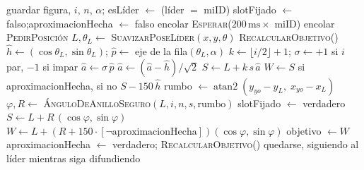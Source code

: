\documentclass[11pt,a4paper]{article}
\theoremstyle{plain}
\newcommand{\hh}{\hat{h}}
\newcommand{\pp}{\hat{p}}
\newcommand{\aaa}{\hat{a}}
\begin{document}
\begin{algorithm}[H]
\caption{Cálculo del objetivo (firmware, en cada seguidor)}
\label{alg:seguidor}
\begin{algorithmic}[1]
  \State guardar figura, $i$, $n$, $\alpha$;\quad
         esLíder $\gets$ (líder $=$ miID)
  \State slotFijado $\gets$ falso;\quad aproximacionHecha $\gets$ falso
  \State encolar \textsc{Esperar}($200\,\text{ms} \times$ miID)
  \State encolar \textsc{PedirPosición}
\EndProcedure
\Statex
{}
  \State $L, \theta_L \gets$ \textsc{SuavizarPoseLíder}$(x,y,\theta)$
  \State \textsc{RecalcularObjetivo}()
\EndProcedure
\Statex
{}
  \State $\hh \gets (\cos\theta_L, \sin\theta_L)$;\quad
         $\pp \gets$ eje de la fila$(\theta_L,\alpha)$
    \State $k \gets \lfloor i/2 \rfloor + 1$;\quad
           $\sigma \gets +1$ si $i$ par, $-1$ si impar
    \State $\aaa \gets \sigma\,\pp$
      \State $\aaa \gets (\aaa - \hh)/\sqrt{2}$
    \EndIf
    \State $S \gets L + k\,s\,\aaa$
    \State $W \gets S$ si aproximacionHecha, si no $S - 150\,\hh$
  \Else
      \State rumbo $\gets \operatorname{atan2}(y_{yo} - y_L,\; x_{yo} - x_L)$
      \State $\varphi, R \gets$ \textsc{ÁnguloDeAnilloSeguro}$(L, i, n, s,
             \text{rumbo})$
      \State slotFijado $\gets$ verdadero
    \EndIf
    \State $S \gets L + R\,(\cos\varphi, \sin\varphi)$
    \State $W \gets L + (R + 150\cdot[\neg\text{aproximacionHecha}])
           (\cos\varphi, \sin\varphi)$
  \EndIf
    \State objetivo $\gets W$
  \EndIf
\EndProcedure
\Statex
{}
    \State aproximacionHecha $\gets$ verdadero;\quad
           \textsc{RecalcularObjetivo}()
  \Else
    \State quedarse, siguiendo al líder mientras siga difundiendo
  \EndIf
\EndProcedure
\end{algorithmic}
\end{algorithm}
\end{document}

